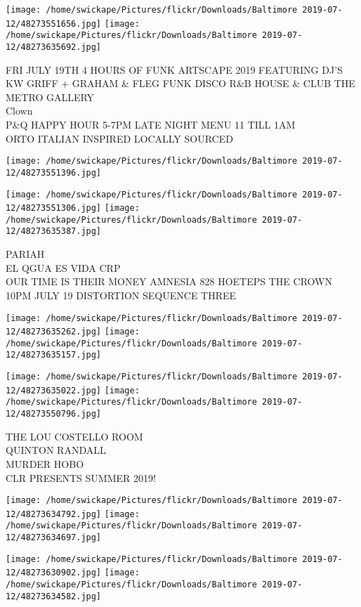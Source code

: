 \documentclass[10pt,letterpaper]{article}
\begin{document}
\texttt{[image: /home/swickape/Pictures/flickr/Downloads/Baltimore 2019-07-12/48273551656.jpg]}
\texttt{[image: /home/swickape/Pictures/flickr/Downloads/Baltimore 2019-07-12/48273635692.jpg]}

FRI JULY 19TH 4 HOURS OF FUNK ARTSCAPE 2019 FEATURING DJ'S KW GRIFF + GRAHAM \& FLEG FUNK DISCO R\&B HOUSE \& CLUB THE METRO GALLERY\\
Clown\\
P\&Q HAPPY HOUR 5{-}7PM LATE NIGHT MENU 11 TILL 1AM\\
ORTO ITALIAN INSPIRED LOCALLY SOURCED
\pagebreak

\texttt{[image: /home/swickape/Pictures/flickr/Downloads/Baltimore 2019-07-12/48273551396.jpg]}

\vspace{0.25in}
\texttt{[image: /home/swickape/Pictures/flickr/Downloads/Baltimore 2019-07-12/48273551306.jpg]}
\texttt{[image: /home/swickape/Pictures/flickr/Downloads/Baltimore 2019-07-12/48273635387.jpg]}

PARIAH\\
EL QGUA ES VIDA CRP\\
OUR TIME IS THEIR MONEY AMNESIA 828 HOETEPS THE CROWN 10PM JULY 19 DISTORTION SEQUENCE THREE
\pagebreak

\texttt{[image: /home/swickape/Pictures/flickr/Downloads/Baltimore 2019-07-12/48273635262.jpg]}
\texttt{[image: /home/swickape/Pictures/flickr/Downloads/Baltimore 2019-07-12/48273635157.jpg]}

\texttt{[image: /home/swickape/Pictures/flickr/Downloads/Baltimore 2019-07-12/48273635022.jpg]}
\texttt{[image: /home/swickape/Pictures/flickr/Downloads/Baltimore 2019-07-12/48273550796.jpg]}

THE LOU COSTELLO ROOM\\
QUINTON RANDALL\\
MURDER HOBO\\
CLR PRESENTS SUMMER 2019!
\pagebreak

\texttt{[image: /home/swickape/Pictures/flickr/Downloads/Baltimore 2019-07-12/48273634792.jpg]}
\texttt{[image: /home/swickape/Pictures/flickr/Downloads/Baltimore 2019-07-12/48273634697.jpg]}

\texttt{[image: /home/swickape/Pictures/flickr/Downloads/Baltimore 2019-07-12/48273630902.jpg]}
\texttt{[image: /home/swickape/Pictures/flickr/Downloads/Baltimore 2019-07-12/48273634582.jpg]}
\end{document}
